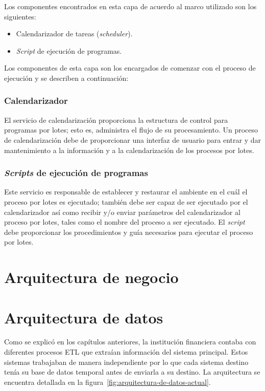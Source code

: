 Los componentes encontrados en esta capa de acuerdo al marco utilizado son los
siguientes:

\begin{itemize}
\item Calendarizador de tareas (\emph{scheduler}).
\item \emph{Script} de ejecución de programas.
\end{itemize}

Los componentes de esta capa son los encargados de comenzar con el proceso de
ejecución y se describen a continuación:

\subsubsection{Calendarizador}

El servicio de calendarización proporciona la estructura de control para
programas por lotes; esto es, administra el flujo de su procesamiento. Un
proceso de calendarización debe de proporcionar una interfaz de usuario para
entrar y dar mantenimiento a la información y a la calendarización de los
procesos por lotes.

\subsubsection{\emph{Scripts} de ejecución de programas}

Este servicio es responsable de establecer y restaurar el ambiente en el cuál el
proceso por lotes es ejecutado; también debe ser capaz de ser ejecutado por el
calendarizador así como recibir y/o enviar parámetros del calendarizador al
proceso por lotes, tales como el nombre del proceso a ser ejecutado. El
\emph{script} debe proporcionar los procedimientos y guía necesarios para
ejecutar el proceso por lotes.

\section{Arquitectura de negocio}


\section{Arquitectura de datos}

Como se explicó en los capítulos anteriores, la institución financiera contaba
con diferentes procesos ETL que extraían información del sistema
principal. Estos sistemas trabajaban de manera independiente por lo que cada
sistema destino tenía su base de datos temporal antes de enviarla a su
destino. La arquitectura se encuentra detallada en la
figura~\ref{fig:arquitectura-de-datos-actual}.

